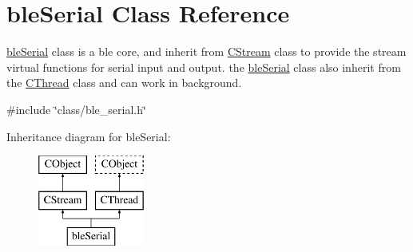 \hypertarget{classble_serial}{\section{ble\-Serial Class Reference}
\label{classble_serial}
}


\hyperlink{classble_serial}{ble\-Serial} class is a ble core, and inherit from \hyperlink{class_c_stream}{C\-Stream} class to provide the stream virtual functions for serial input and output. the \hyperlink{classble_serial}{ble\-Serial} class also inherit from the \hyperlink{class_c_thread}{C\-Thread} class and can work in background.  




{\ttfamily \#include \char`\"{}class/ble\-\_\-serial.\-h\char`\"{}}

Inheritance diagram for ble\-Serial\-:\begin{figure}[H]
\begin{center}
\leavevmode
\includegraphics[height=3.000000cm]{d7/d03/classble_serial}
\end{center}
\end{figure}
